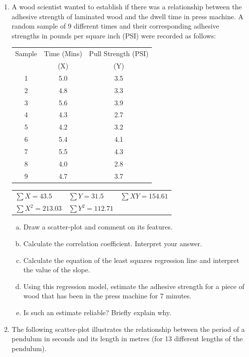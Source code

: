 \documentclass[a4paper,12pt]{article}
\begin{document}
\begin{enumerate}
\item 

A wood scientist wanted to establish if there was a relationship between the adhesive strength of laminated wood and the dwell time in press machine. A random sample of 9 different times and their corresponding adhesive strengths in pounds per square inch (PSI) were recorded as follows:

\begin{center}
\begin{tabular}{|c|c|c|}

  \hline
Sample &Time (Mins) & Pull Strength (PSI) \\
 & (X)  &  (Y)\\ \hline
1& 5.0& 3.5 \\
2& 4.8& 3.3\\
3& 5.6& 3.9\\
4& 4.3& 2.7\\
5& 4.2& 3.2\\
6& 5.4& 4.1\\
7& 5.5& 4.3\\
8& 4.0& 2.8\\
9& 4.7& 3.7\\
  \hline
\end{tabular}
\bigskip

\begin{tabular}{lll}
  $\sum X = 43.5$ & $\sum Y = 31.5$ & $\sum XY = 154.61$ \\
  $\sum X^2 = 213.03$ & $\sum Y^2 = 112.71$ &  \\
 \end{tabular}
 \end{center}
\begin{enumerate}[(a)]
\item Draw a scatter-plot and comment on its features.
\item Calculate the correlation coefficient. Interpret your answer.
\item Calculate the equation of the least squares regression line and interpret the value of the slope.
\item Using this regression model, estimate the adhesive strength for a piece of wood that has been in the press machine for 7 minutes.
\item Is such an estimate reliable? Briefly explain why.
\end{enumerate}

\item 
The following scatter-plot illustrates the relationship between the period of a pendulum in seconds and its length in metres (for 13 different lengths of the pendulum).


\end{enumerate}
\end{document}
